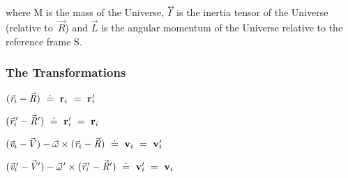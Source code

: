 \documentclass[10pt]{article}
\begin{document}
\par \bigskip \noindent where ${\mathrm{M}}$ is the mass of the Universe, ${\mathit{I}}{\vphantom{\sum_1^2}}^{\hspace{-0.555em}\leftrightarrow}\hspace{-0.300em}$ is the inertia tensor of the Universe (relative \hbox {to ${\vec{\mathit{R}}}$)} and ${\vec{\mathit{L}}}$ is the angular momentum of the Universe relative to the reference frame S.

\vspace{+1.50em}

\par {\centering\subsubsection*{The Transformations}}

\par \bigskip\medskip \hspace{-1.80em} $({\vec{\mathit{r}}}_i - {\vec{\mathit{R}}}) ~\doteq~ {\mathbf{r}}_i ~=~ {\mathbf{r}}_i\hspace{-0.300em}'$

\par \bigskip \hspace{-1.80em} $({\vec{\mathit{r}}}_i\hspace{-0.150em}' - {\vec{\mathit{R}}}\hspace{+0.015em}') ~\doteq~ {\mathbf{r}}_i\hspace{-0.300em}' ~=~ {\mathbf{r}}_i$

\par \bigskip \hspace{-1.80em} $({\vec{\mathit{v}}}_i - \hspace{-0.120em}{\vec{\mathit{V}}}) - {\vec{\omega}} \times ({\vec{\mathit{r}}}_i - {\vec{\mathit{R}}}) ~\doteq~ {\mathbf{v}}_i ~=~ {\mathbf{v}}_i\hspace{-0.300em}'$

\par \bigskip \hspace{-1.80em} $({\vec{\mathit{v}}}_i\hspace{-0.150em}' - \hspace{-0.120em}{\vec{\mathit{V}}}\hspace{-0.045em}') - {\vec{\omega}}\hspace{+0.060em}' \times ({\vec{\mathit{r}}}_i\hspace{-0.150em}' - {\vec{\mathit{R}}}\hspace{+0.015em}') ~\doteq~ {\mathbf{v}}_i\hspace{-0.300em}' ~=~ {\mathbf{v}}_i$
\end{document}
